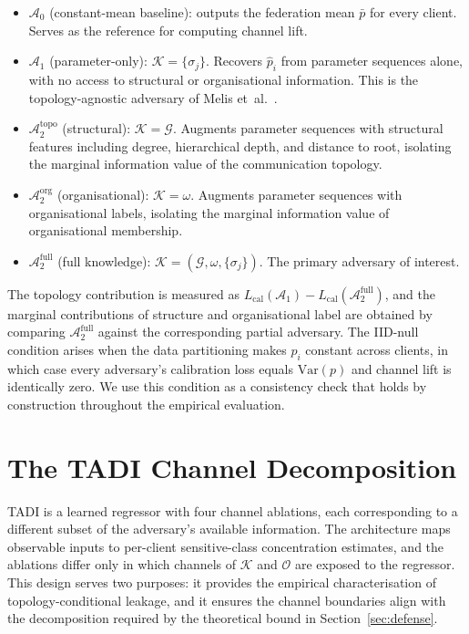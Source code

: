 \documentclass[letterpaper,journal]{IEEEtran}
\newcommand{\TADI}{\textsc{TADI}\xspace}
\begin{document}
\begin{itemize}[topsep=2pt,itemsep=2pt,leftmargin=*]
\item $\mathcal{A}_0$ (constant-mean baseline): outputs the
  federation mean $\bar{p}$ for every client. Serves as the
  reference for computing channel lift.
\item $\mathcal{A}_1$ (parameter-only): $\mathcal{K} =
  \{\sigma_j\}$. Recovers $\hat{p}_i$ from parameter sequences
  alone, with no access to structural or organisational information.
  This is the topology-agnostic adversary of Melis
  et~al.~\cite{melis2019exploiting}.
\item $\mathcal{A}_2^{\text{topo}}$ (structural): $\mathcal{K} =
  \mathcal{G}$. Augments parameter sequences with structural
  features including degree, hierarchical depth, and distance to
  root, isolating the marginal information value of the
  communication topology.
\item $\mathcal{A}_2^{\text{org}}$ (organisational): $\mathcal{K} =
  \omega$. Augments parameter sequences with organisational labels,
  isolating the marginal information value of organisational
  membership.
\item $\mathcal{A}_2^{\text{full}}$ (full knowledge): $\mathcal{K}
  = (\mathcal{G}, \omega, \{\sigma_j\})$. The primary adversary of
  interest.\medskip
\end{itemize}

The topology contribution is measured as $L_{\text{cal}}(\mathcal{A}_1)
- L_{\text{cal}}(\mathcal{A}_2^{\text{full}})$, and the marginal
contributions of structure and organisational label are obtained by
comparing $\mathcal{A}_2^{\text{full}}$ against the corresponding
partial adversary. The IID-null condition arises when the data
partitioning makes $p_i$ constant across clients, in which case
every adversary's calibration loss equals $\mathrm{Var}(p)$ and
channel lift is identically zero. We use this condition as a
consistency check that holds by construction throughout the empirical
evaluation.

\section{The \TADI Channel Decomposition}
\label{sec:attack}

\TADI is a learned regressor with four channel ablations, each
corresponding to a different subset of the adversary's available
information. The architecture maps observable inputs to per-client
sensitive-class concentration estimates, and the ablations differ
only in which channels of $\mathcal{K}$ and $\mathcal{O}$ are
exposed to the regressor. This design serves two purposes: it
provides the empirical characterisation of topology-conditional
leakage, and it ensures the channel boundaries align with the
decomposition required by the theoretical bound in
Section~\ref{sec:defense}.
\end{document}
